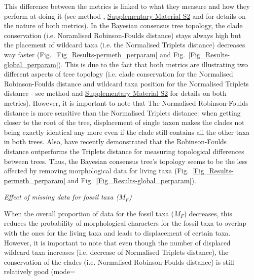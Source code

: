 \documentclass[12pt,letterpaper]{article}
\renewcommand{\subsection}[1]{%
\bigskip
\begin{center}
\begin{large}
\normalfont\itshape #1
\end{large}
\end{center}}
\begin{document}
This difference between the metrics is linked to what they measure and how they perform at doing it (see method %
, \hyperref[SupplementaryMaterial]{Supplementary Material S2} and \citealt{kuhnerpractical2014} for details on the nature of both metrics). In the Bayesian consensus tree topology, the clade conservation (i.e. Noramlised Robinson-Foulds distance) stays always high but the placement of wildcard taxa (i.e. the Normalised Triplets distance) decreases way faster (Fig.~\ref{Fig_Results-permeth_perparam} and Fig.~\ref{Fig_Results-global_perparam}). This is due to the fact that both metrics are illustrating two different aspects of tree topology (i.e. clade conservation for the Normalised Robinson-Foulds distance and wildcard taxa position for the Normalised Triplets distance - see method %
and \hyperref[SupplementaryMaterial]{Supplementary Material S2} for details on both metrics). However, it is important to note that The Normalised Robinson-Foulds distance is more sensitive than the Normalised Triplets distance: when getting closer to the root of the tree, displacement of single taxon makes the clades not being exactly identical any more even if the clade still contains all the other taxa in both trees. Also, \citet{kuhnerpractical2014} have recently demonstrated that the Robinson-Foulds distance outperforms the Triplets distance for measuring topological differences between trees. Thus, the Bayesian consensus tree's topology seems to be the less affected by removing morphological data for living taxa (Fig.~\ref{Fig_Results-permeth_perparam} and Fig.~\ref{Fig_Results-global_perparam}).

\subsection{Effect of missing data for fossil taxa ($M_{F}$)}
When the overall proportion of data for the fossil taxa ($M_{F}$) decreases, this reduces the probability of morphological characters for the fossil taxa to overlap with the ones for the living taxa and leads to displacement of certain taxa. However, it is important to note that even though the number of displaced wildcard taxa increases (i.e. decrease of Normalised Triplets distance), the conservation of the clades (i.e. Normalised Robinson-Foulds distance) is still relatively good (mode=%
\end{document}

